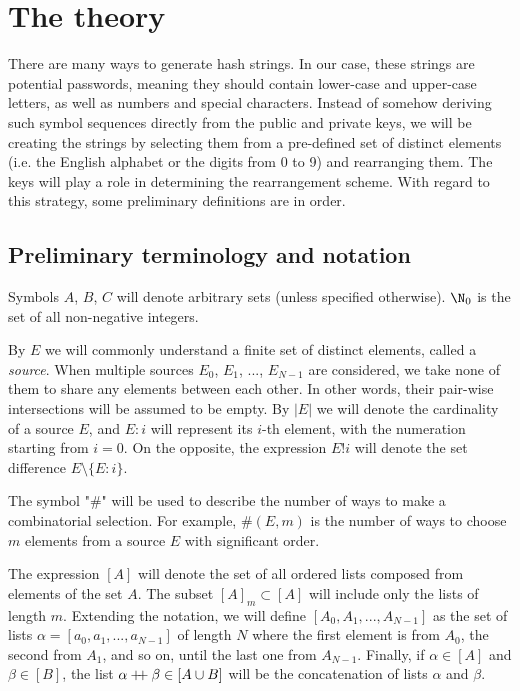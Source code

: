 \documentclass[12pt, a4paper]{article}
\newcommand{\dop}{\mathbin{{+}\hspace{-1mm}{+}}}
\newcommand{\elt}{\mathop{:}}
\newcommand{\wo}{\mathop{!}}
\begin{document}
\section{The theory}

There are many ways to generate hash strings. In our case, these strings are potential passwords, meaning they should contain lower-case and upper-case letters, as well as numbers and special characters. Instead of somehow deriving such symbol sequences directly from the public and private keys, we will be creating the strings by selecting them from a pre-defined set of distinct elements (i.e. the English alphabet or the digits from 0 to 9) and rearranging them. The keys will play a role in determining the rearrangement scheme. With regard to this strategy, some preliminary definitions are in order.

\subsection{Preliminary terminology and notation}

Symbols $ A $, $ B $, $ C $ will denote arbitrary sets (unless specified otherwise). $ \N_0 $ is the set of all non-negative integers.

By $ E $ we will commonly understand a finite set of distinct elements, called a \emph{source}. When multiple sources $ E_0 $, $ E_1 $, ..., $ E_{N-1} $ are considered, we take none of them to share any elements between each other. In other words, their pair-wise intersections will be assumed to be empty. By $ |E| $ we will denote the cardinality of a source $ E $, and $ E \elt i $ will represent its $ i $-th element, with the numeration starting from $ i = 0 $. On the opposite, the expression $ E \wo i $ will denote the set difference $ E \setminus \{E \elt i\} $.

The symbol "$ \# $" will be used to describe the number of ways to make a combinatorial selection. For example, $ \#(E, m) $ is the number of ways to choose $ m $ elements from a source $ E $ with significant order.

The expression $ [A] $ will denote the set of all ordered lists composed from elements of the set $ A $. The subset $ [A]_m \subset [A] $ will include only the lists of length $ m $. Extending the notation, we will define $ [A_0, A_1, ..., A_{N-1}] $ as the set of lists $ \alpha = [a_0, a_1, ..., a_{N-1}] $ of length $ N $ where the first element is from $ A_0 $, the second from $ A_1 $, and so on, until the last one from $ A_{N-1} $. Finally, if $ \alpha \in [A] $ and $ \beta \in [B] $, the list $ \alpha \dop \beta \in [A \cup B] $ will be the concatenation of lists $ \alpha $ and $ \beta $.
\end{document}
